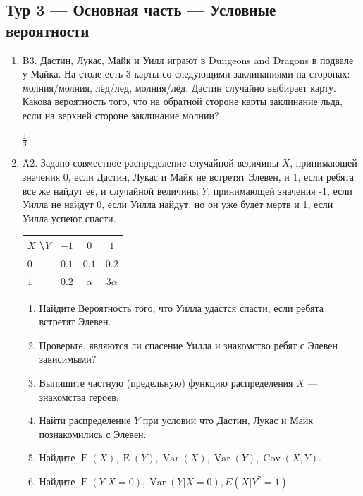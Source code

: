 \documentclass[12pt]{article}
\DeclareMathOperator{\Cov}{Cov}
\DeclareMathOperator{\Var}{Var}
\DeclareMathOperator{\E}{E}
\newenvironment{problem}{}{}
\newenvironment{sol}{}{} %
\begin{document}
\newpage{}
\subsection{Тур 3 — Основная часть — Условные вероятности}


\begin{enumerate}

\begin{problem}
\item[B3.] Дастин, Лукас, Майк и Уилл играют в Dungeons and Dragons в подвале у Майка. На столе есть 3 карты со следующими заклинаниями на сторонах: молния/молния, лёд/лёд, молния/лёд. Дастин случайно выбирает карту. Какова вероятность того, что на обратной стороне карты заклинание льда, если на верхней стороне заклинание молнии? 

\begin{sol}
$\frac{1}{3}$
\end{sol}
\end{problem}

\begin{problem}
\item[A2.] Задано совместное распределение случайной величины $X$, принимающей значения 0, если Дастин, Лукас и Майк не встретят Элевен, и 1, если ребята все же найдут её, и случайной величины $Y$, принимающей значения -1, если Уилла не найдут 0, если Уилла найдут, но он уже будет мертв и 1, если Уилла успеют спасти.

\begin{center}\begin{tabular}{lccc}
\toprule
 $X$ \textbackslash $Y$    & $-1$  & $0$   & $1$   \\ \midrule
$0$                 & $0.1$ & $0.1$ & $0.2$ \\ 
 $1$                 & $0.2$ & $\alpha$ & $3\alpha$ \\ \bottomrule
\end{tabular}\end{center}

\begin{enumerate}
\item Найдите Вероятность того, что Уилла удастся спасти, если ребята встретят Элевен. 
\item Проверьте, являются ли спасение Уилла и знакомство ребят с Элевен зависимыми?
\item Выпишите частную (предельную) функцию распределения $X$ — знакомства героев. 
\item Найти распределение $Y$ при условии что Дастин, Лукас и Майк познакомились с Элевен. 
\item Найдите $\E(X), \E(Y), \Var(X), \Var(Y), \Cov(X,Y)$. 
\item Найдите $\E(Y| X=0), \Var(Y| X=0), E(X| Y^2=1)$
\end{enumerate}


\end{problem}
\end{enumerate}
\end{document}
